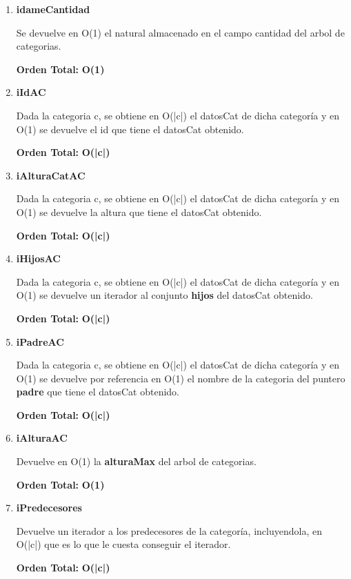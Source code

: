 \begin{enumerate}
\item\textbf{idameCantidad}
\par Se devuelve en O(1) el natural almacenado en el campo cantidad del arbol de categorias.
\par \textbf{Orden Total:} \textbf{O(1)}

\item\textbf{iIdAC}
\par Dada la categoria c, se obtiene en O(|c|) el datosCat de dicha categoría y en O(1) se devuelve el id que tiene el datosCat obtenido.
\par \textbf{Orden Total:} \textbf{O(|c|)}

\item\textbf{iAlturaCatAC}
\par Dada la categoria c, se obtiene en O(|c|) el datosCat de dicha categoría y en O(1) se devuelve la altura que tiene el datosCat obtenido.
\par \textbf{Orden Total:} \textbf{O(|c|)}

\item\textbf{iHijosAC}
\par Dada la categoria c, se obtiene en O(|c|) el datosCat de dicha categoría y en O(1) se devuelve un iterador al conjunto \textbf{hijos} del datosCat obtenido.
\par \textbf{Orden Total:} \textbf{O(|c|)}

\item\textbf{iPadreAC}
\par Dada la categoria c, se obtiene en O(|c|) el datosCat de dicha categoría y en O(1) se devuelve por referencia en O(1) el nombre de la categoria del puntero \textbf{padre} que tiene el datosCat obtenido.
\par \textbf{Orden Total:} \textbf{O(|c|)}

\item\textbf{iAlturaAC}
\par Devuelve en O(1) la \textbf{alturaMax} del arbol de categorias.
\par \textbf{Orden Total:} \textbf{O(1)}

\item\textbf{iPredecesores}
\par Devuelve un iterador a los predecesores de la categoría, incluyendola, en O(|c|) que es lo que le cuesta conseguir el iterador.
\par \textbf{Orden Total:} \textbf{O(|c|)}


\end{enumerate}
